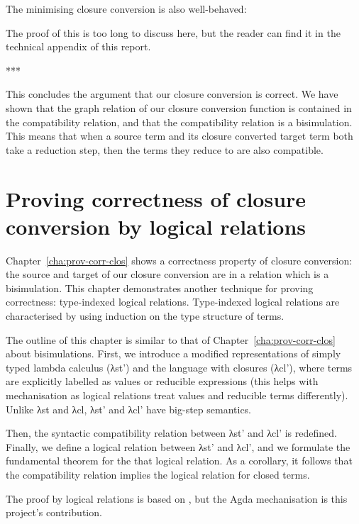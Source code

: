 \documentclass[bsc,frontabs,oneside,singlespacing,parskip,deptreport]{infthesis}
\theoremstyle{definition}
\theoremstyle{lemma}
\begin{document}

The minimising closure conversion  is also well-behaved:


The proof of this is too long to discuss here, but the reader can find
it in the technical appendix of this report.

***

This concludes the argument that our closure conversion is correct. We
have shown that the graph relation of our closure conversion function
is contained in the compatibility relation, and that the compatibility
relation is a bisimulation. This means that when a source term and its
closure converted target term both take a reduction step, then the
terms they reduce to are also compatible.

\chapter{Proving correctness of closure conversion by logical
  relations}
\label{cha:proof-logic-relat}

Chapter~\ref{cha:prov-corr-clos} shows a correctness property of
closure conversion: the source and target of our closure conversion
are in a relation which is a bisimulation. This chapter demonstrates
another technique for proving correctness: type-indexed logical
relations. Type-indexed logical relations are characterised by using
induction on the type structure of terms.

The outline of this chapter is similar to that of
Chapter~\ref{cha:prov-corr-clos} about bisimulations. First, we
introduce a modified representations of simply typed lambda calculus
(λst') and the language with closures (λcl'), where terms are
explicitly labelled as values or reducible expressions (this helps
with mechanisation as logical relations treat values and reducible
terms differently). Unlike λst and λcl, λst' and λcl' have big-step
semantics. 

Then, the syntactic compatibility relation between λst' and λcl' is
redefined. Finally, we define a logical relation between λst' and
λcl', and we formulate the fundamental theorem for the that logical
relation. As a corollary, it follows that the compatibility relation
implies the logical relation for closed terms.

The proof by logical relations is based on
\cite{DBLP:conf/popl/MinamideMH96}, but the Agda mechanisation is this
project's contribution.
\end{document}
